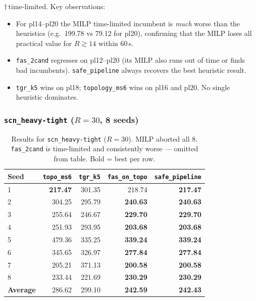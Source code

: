 \noindent $\dagger$\,time-limited.  Key observations:

\begin{itemize}[noitemsep]
    \item For pl14--pl20 the MILP time-limited incumbent is \emph{much} worse
          than the heuristics (e.g.\ 199.78 vs 79.12 for pl20), confirming that
          the MILP loses all practical value for $R\gtrsim 14$ within 60\,s.
    \item \texttt{fas\_2cand} regresses on pl12--pl20 (its MILP also runs out
          of time or finds bad incumbents).  \texttt{safe\_pipeline} always
          recovers the best heuristic result.
    \item \texttt{tgr\_k5} wins on pl18; \texttt{topology\_ms6} wins on pl16
          and pl20.  No single heuristic dominates.
\end{itemize}

\subsubsection{\texttt{scn\_heavy-tight} ($R=30$, 8 seeds)}

\begin{table}[h]
\centering
\caption{Results for \texttt{scn\_heavy-tight} ($R=30$).  MILP aborted all 8.
\texttt{fas\_2cand} is time-limited and consistently worse — omitted from table.
Bold = best per row.}
\label{tab:exp06-r30}
\begin{tabular}{lrrrr}
\toprule
Seed & \texttt{topo\_ms6} & \texttt{tgr\_k5} & \texttt{fas\_on\_topo} & \texttt{safe\_pipeline} \\
\midrule
1 & \textbf{217.47} & 301.35 & 218.74 & \textbf{217.47} \\
2 & 304.25 & 295.79 & \textbf{240.63} & \textbf{240.63} \\
3 & 255.64 & 246.67 & \textbf{229.70} & \textbf{229.70} \\
4 & 251.93 & 293.95 & \textbf{203.68} & \textbf{203.68} \\
5 & 479.36 & 335.25 & \textbf{339.24} & \textbf{339.24} \\
6 & 345.65 & 326.97 & \textbf{277.84} & \textbf{277.84} \\
7 & 205.21 & 371.13 & \textbf{200.58} & \textbf{200.58} \\
8 & 233.44 & 221.69 & \textbf{230.29} & \textbf{230.29} \\
\midrule
\textbf{Average} & 286.62 & 299.10 & \textbf{242.59} & \textbf{242.43} \\
\bottomrule
\end{tabular}
\end{table}

